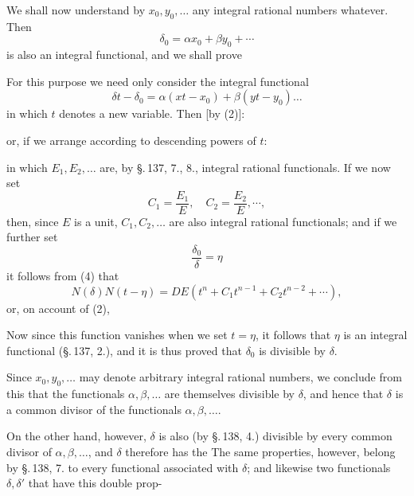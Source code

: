 
We shall now understand by $x_0, y_0, \dots$ any integral rational numbers whatever. Then
\[ \delta_0 = \alpha x_0 + \beta y_0 + \cdots \]
is also an integral functional, and we shall prove 

For this purpose we need only consider the integral functional
\[ \delta t - \delta_0 = \alpha (x t - x_0) + \beta (y t - y_0) \dots \]
in which $t$ denotes a new variable. Then [by (2)]:


or, if we arrange according to descending powers of $t$:


in which $E_1, E_2, \dots$ are, by \S.\,137, 7., 8., integral rational functionals. If we now set
\[ C_1 = \frac{E_1}{E}, \quad C_2 = \frac{E_2}{E}, \cdots, \]
then, since $E$ is a unit, $C_1, C_2, \dots$ are also integral rational functionals; and if we further set
\[ \frac{\delta_0}{\delta} = \eta \]
it follows from (4) that
\[ N (\delta) N (t - \eta) = D E (t^n + C_1 t^{n-1} + C_2 t^{n-2} + \cdots), \]
or, on account of (2),


Now since this function vanishes when we set $t = \eta$, it follows that $\eta$ is an integral functional (\S.\,137, 2.), and it is thus proved that $\delta_0$ is divisible by $\delta$.

Since $x_0, y_0, \dots$ may denote arbitrary integral rational numbers, we conclude from this that the functionals $\alpha, \beta, \dots$ are themselves divisible by $\delta$, and hence that $\delta$ is a common divisor of the functionals $\alpha, \beta, \dots$.

On the other hand, however, $\delta$ is also (by \S.\,138, 4.) divisible by every common divisor of $\alpha, \beta, \dots$, and $\delta$ therefore has the  The same properties, however, belong by \S.\,138, 7. to every functional associated with $\delta$; and likewise two functionals $\delta, \delta'$ that have this double prop-

